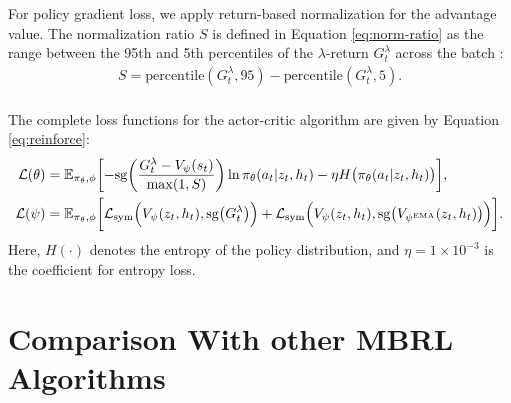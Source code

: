 For policy gradient loss, we apply return-based normalization for the advantage value.
The normalization ratio $S$ is defined in Equation \eqref{eq:norm-ratio} as the range between the 95th and 5th percentiles of the $\lambda$-return $G^\lambda_{t}$ across the batch \citep{hafner_mastering_2023}:
\begin{equation} \label{eq:norm-ratio}
\begin{gathered}
S = \mathrm{percentile}(G^\lambda_{t}, 95) - \mathrm{percentile}(G^\lambda_{t}, 5).\\
\end{gathered}
\end{equation}

The complete loss functions for the actor-critic algorithm are given by Equation \eqref{eq:reinforce}:
\begin{subequations} \label{eq:reinforce}
\begin{align}
\label{eq:reinforce_actor}
\mathcal{L}(\theta)& = \mathbb{E}_{\pi_\theta, \phi}\biggl[-\mathrm{sg}\bigg(\frac{G^\lambda_{t}- V_{\psi}(s_{t})}{\max(1, S)}\bigg) \ln \pi_\theta(a_t|z_t, h_t) -\eta H\bigl(\pi_\theta(a_t|z_t, h_t)\bigr)\biggr],\\
\label{eq:reinforce_critic}
\mathcal{L}(\psi)& =  \mathbb{E}_{\pi_\theta, \phi}\biggl[
\mathcal{L}_{\rm sym}\Bigl(V_\psi(z_t, h_t), \mathrm{sg}\bigl(G^\lambda_{t}\bigr)\Bigr) +
\mathcal{L}_{\rm sym}\Bigl(V_\psi(z_t, h_t), \mathrm{sg}\bigl(V_{\psi^{\mathrm{EMA}}}(z_t, h_t)\bigr)\Bigr)\biggr].
\end{align}
\end{subequations}
Here, $H(\cdot)$ denotes the entropy of the policy distribution, and $\eta=1\times 10^{-3}$ is the coefficient for entropy loss.

\newpage
\section{Comparison With other MBRL Algorithms} \label{sec:full-compare}

